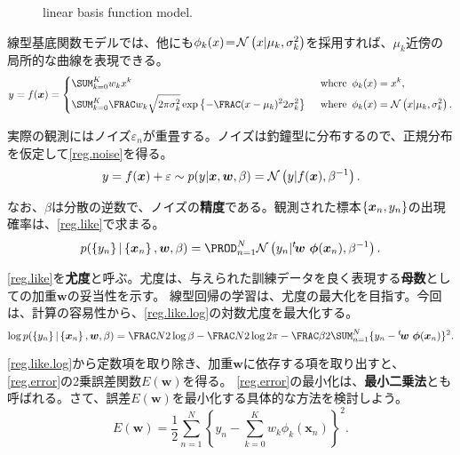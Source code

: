 \documentclass[10pt,a4paper]{book}
\begin{document}
\begin{figure}[h]
\centering
{}
\caption{linear basis function model.\label{fig:reg.cubic}}
\end{figure}

線型基底関数モデルでは、他にも$\phi_k(x)\!=\!\mathcal{N}\left(x|\mu_k,\sigma_k^2\right)$を採用すれば、$\mu_k$近傍の局所的な曲線を表現できる。
%
\begin{equation}
y = f(\bm{x}) = \left\{
\begin{aligned}
&\sum_{k=0}^K w_k x^k&
&\where \phi_k(x)=x^k,\\
&\sum_{k=0}^K \frac{w_k}{\sqrt{2\pi\sigma_k^2}}\exp\left\{-\frac{(x-\mu_k)^2}{2\sigma_k^2}\right\}&
&\where \phi_k(x)=\Nd{x|\mu_k,\sigma_k^2}.
\end{aligned}
\right.
\end{equation}

実際の観測にはノイズ$\varepsilon_n$が重畳する。ノイズは釣鐘型に分布するので、正規分布を仮定して\eqref{reg.noise}を得る。
%
\begin{equation}
\label{eq:reg.noise}
y = f(\bm{x}) + \varepsilon \sim p(y|\bm{x},\bm{w},\beta) = \mathcal{N}\left(y|f(\bm{x}),\beta^{-1}\right).
\end{equation}

なお、$\beta$は分散の逆数で、ノイズの\textbf{精度}である。観測された標本$\seq{\bm{x}_n,y_n}$の出現確率は、\eqref{reg.like}で求まる。
%
\begin{equation}
\label{eq:reg.like}
p(\seq{y_n}|\seq{\bm{x}_n},\bm{w},\beta) = \prod_{n=1}^N \Nd{y_n|\trans{\bm{w}}\bm{\phi}(\bm{x}_n), \beta^{-1}}.
\end{equation}

\eqref{reg.like}を\textbf{尤度}と呼ぶ。尤度は、与えられた訓練データを良く表現する\textbf{母数}としての加重$\bm{w}$の妥当性を示す。
線型回帰の学習は、尤度の最大化を目指す。今回は、計算の容易性から、\eqref{reg.like.log}の対数尤度を最大化する。
%
\begin{equation}
\label{eq:reg.like.log}
\log p(\seq{y_n}|\seq{\bm{x}_n},\bm{w},\beta)
= \frac{N}{2}\log\beta - \frac{N}{2}\log2\pi - \frac{\beta}{2}\sum_{n=1}^N\{y_n-\trans{\bm{w}}\bm{\phi}(\bm{x}_n)\}^2.
\end{equation}

\eqref{reg.like.log}から定数項を取り除き、加重$\bm{w}$に依存する項を取り出すと、\eqref{reg.error}の2乗誤差関数$E(\bm{w})$を得る。
\eqref{reg.error}の最小化は、\textbf{最小二乗法}とも呼ばれる。さて、誤差$E(\bm{w})$を最小化する具体的な方法を検討しよう。
%
\begin{equation}
\label{eq:reg.error}
E(\bm{w}) = \frac{1}{2} \sum_{n=1}^N \left\{y_n - \sum_{k=0}^K w_k \phi_k(\bm{x}_n)\right\}^2.
\end{equation}
\end{document}
